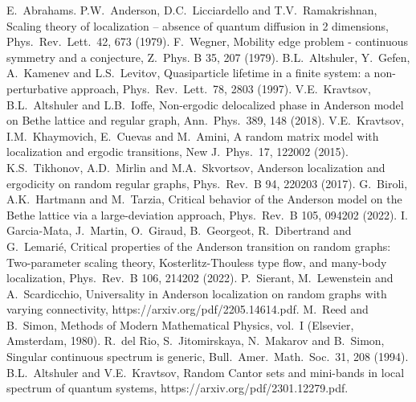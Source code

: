 \documentclass[aps,prl,twocolumn,letterpaper,superscriptaddress]{revtex4-2}
\begin{document}
\begin{thebibliography}{99}
 E.\ Abrahams. P.W.\ Anderson, D.C.\ Licciardello and T.V.\ Ramakrishnan, Scaling theory of localization -- absence of quantum diffusion in 2 dimensions, Phys.\ Rev.\ Lett.\ 42, 673 (1979).
 F.\ Wegner, Mobility edge problem - continuous symmetry and a conjecture, Z.\ Phys. B 35, 207 (1979).
 B.L.\ Altshuler, Y.\ Gefen, A.\ Kamenev and L.S.\ Levitov, Quasiparticle lifetime in a finite system: a non-perturbative approach, Phys.\ Rev.\ Lett.\ 78, 2803 (1997).
 V.E.\ Kravtsov, B.L.\ Altshuler and L.B.\ Ioffe, Non-ergodic delocalized phase in Anderson model on Bethe lattice and regular graph, Ann.\ Phys.\ 389, 148 (2018).
 V.E.\ Kravtsov, I.M.\ Khaymovich, E.\ Cuevas and M.\ Amini, A random matrix model with localization and ergodic transitions, New J.\ Phys.\ 17, 122002 (2015).
 K.S.\ Tikhonov, A.D.\ Mirlin and M.A.\ Skvortsov, Anderson localization and ergodicity on random regular graphs, Phys.\ Rev.\ B 94, 220203 (2017).
 G.\ Biroli, A.K.\ Hartmann and M.\ Tarzia, Critical behavior of the Anderson model on the Bethe lattice via a large-deviation approach, Phys.\ Rev.\ B 105, 094202 (2022).
 I. Garcia-Mata, J.\ Martin, O.\ Giraud, B.\ Georgeot, R.\ Dibertrand and G.\ Lemari\'e, Critical properties of the Anderson transition on random graphs: Two-parameter scaling theory, Kosterlitz-Thouless type flow, and many-body localization, Phys.\ Rev.\ B 106, 214202 (2022).
 P.\ Sierant, M.\ Lewenstein and A.\ Scardicchio, Universality in Anderson localization on random graphs with varying connectivity, https://arxiv.org/pdf/2205.14614.pdf.
 M.\ Reed and B.\ Simon, Methods of Modern Mathematical Physics, vol.\ I (Elsevier, Amsterdam, 1980).
 R.\ del Rio, S.\ Jitomirskaya, N.\ Makarov and B.\ Simon, Singular continuous spectrum is generic, Bull.\ Amer.\ Math.\ Soc.\ 31, 208 (1994).
 B.L.\ Altshuler and V.E.\ Kravtsov, Random Cantor sets and mini-bands in local spectrum of quantum systems, https://arxiv.org/pdf/2301.12279.pdf. 

\end{thebibliography}
\end{document}
